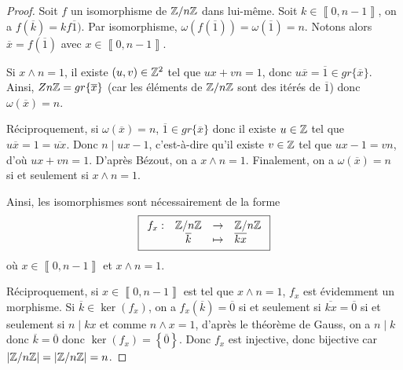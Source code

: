 \begin{proof}
	Soit $f$ un isomorphisme de $\mathbb{Z}/n\mathbb{Z}$ dans lui-même. Soit $k\in\left\llbracket 0, n-1\right\rrbracket$, on a $f(\overline{k})=kf\overline{1})$. Par isomorphisme, $\omega(f(\overline{1}))=\omega(\overline{1})=n$. Notons alors $\overline{x}=f(\overline{1})$ avec $x\in\left\llbracket 0,n-1\right\rrbracket$.

	Si $x\wedge n=1$, il existe $(u,v)\in\mathbb{Z}^{2}$ tel que $ux+vn=1$, donc $u\overline{x}=\overline{1}\in gr\{\overline{x}\}$. Ainsi, $Z\/n\mathbb{Z}=gr\{\overline{x}\}$ (car les éléments de $\mathbb{Z}/n\mathbb{Z}$ sont des itérés de $\overline{1}$) donc $\omega(\overline{x})=n$.

	Réciproquement, si $\omega(\overline{x})=n$, $\overline{1}\in gr\{\overline{x}\}$ donc il existe $u\in\mathbb{Z}$ tel que $u\overline{x}=1=\overline{ux}$. Donc $n\mid ux-1$, c'est-à-dire qu'il existe $v\in\mathbb{Z}$ tel que $ux-1=vn$, d'où $ux+vn=1$. D'après Bézout, on a $x\wedge n=1$. Finalement, on a $\omega(\overline{x})=n$ si et seulement si $x\wedge n=1$.

	Ainsi, les isomorphismes sont nécessairement de la forme 
	\begin{equation}
		\boxed{$$ \begin{array}{rccl} f_{x}: & \mathbb{Z}/n\mathbb{Z} & \to & \mathbb{Z}/n\mathbb{Z} \\ & \overline{k} & \mapsto & \overline{kx} \end{array} $$}
	\end{equation}
	où $x\in\left\llbracket 0,n-1\right\rrbracket$ et $x\wedge n=1$.

	Réciproquement, si $x\in\left\llbracket 0,n-1\right\rrbracket$ est tel que $x\wedge n=1$, $f_{x}$ est évidemment un morphisme. Si $\overline{k}\in\ker\left(f_{x}\right)$, on a $f_{x}\left(\overline{k}\right)=\overline{0}$ si et seulement si $\overline{kx}=\overline{0}$ si et seulement si $n\mid kx$ et comme $n\wedge x=1$, d'après le théorème de Gauss, on a $n\mid k$ donc $\overline{k}=\overline{0}$ donc $\ker\left(f_{x}\right)=\left\{\overline{0}\right\}$. Donc $f_{x}$ est injective, donc bijective car $\left\vert\mathbb{Z}/n\mathbb{Z}\right\vert=\left\vert\mathbb{Z}/n\mathbb{Z}\right\vert=n$.
\end{proof}

